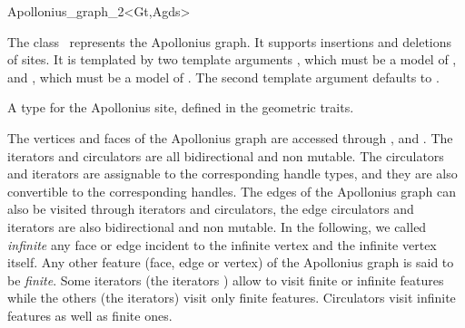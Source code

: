 

\begin{ccRefClass}{Apollonius_graph_2<Gt,Agds>}

\ccDefinition

The class \ccRefName\ represents the
Apollonius graph. It supports insertions and deletions of sites.
It is templated by two template arguments , which
must be a model of , and ,
which must be a model of .
The second template argument defaults to
.


\ccTypes

%
\ccGlue
{}
\ccGlue
{}
\ccGlue
{}
{A type for the Apollonius site, defined in the geometric traits.}
\ccGlue
%


The vertices and faces of the Apollonius graph are accessed
through , 
 and . 
The iterators and circulators
are all bidirectional and non mutable.
The circulators and iterators are assignable to the 
corresponding handle types, and they are also convertible to the
corresponding handles.
The edges of the Apollonius graph can also be visited through iterators
and circulators,
the edge circulators and iterators
are also bidirectional and non mutable.
In the following, we called {\it infinite} any face or edge 
incident  to the infinite vertex and the infinite vertex itself.
Any other feature (face, edge or vertex) of the Apollonius graph is said 
to be {\it finite}.
Some iterators (the  iterators ) allow to visit finite or 
infinite features while the others (the  iterators) visit only
finite features. Circulators visit infinite features as well as finite 
ones.


\end{ccRefClass}
